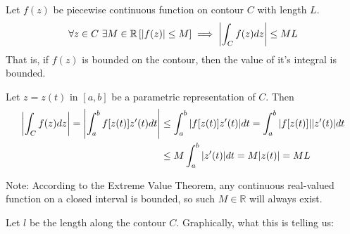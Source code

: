 \documentclass[12pt, english]{book}
\makeatletter
\renewenvironment{proof}[1][\proofname]{\par
	\pushQED{\qed}%
	\normalfont \topsep6\p@\@plus6\p@\relax
	\list{}{%
		\settowidth{\leftmargin}{\itshape\proofname:\hskip\labelsep}%
		\setlength{\labelwidth}{0pt}%
		\setlength{\itemindent}{-\leftmargin}%
	}%
	\item[\hskip\labelsep\itshape#1\@addpunct{:}]\ignorespaces
	}{ \popQED\endlist\@endpefalse}
\makeatother
\begin{document}
	\begin{theorem}[ML Inequality]
		\label{ML Inequality Theorem - Complex}
		Let \(f(z)\) be piecewise continuous function on contour \(C\) with length \(L\).
		\begin{align*}
			\forall z \in C \ \exists M \in \mathbb{R} 
			\left[\abs{f(z)} \leq M \right] \implies \abs{\int_{C} f(z) dz} \leq ML 
		\end{align*}
		That is, if \(f(z)\) is bounded on the contour, then the value of it's integral is bounded. 
	\end{theorem}
	\begin{proof}
		Let \(z = z(t)\) in \([a, b]\) be a parametric representation of \(C\). Then
		\begin{align*}
			\abs{\int_{C} f(z) dz} = \abs{\int_{a}^{b} f[z(t)] z'(t) dt} 
			&\leq \int_{a}^{b} \abs{f[z(t)] z'(t)} dt = \int_{a}^{b}  \abs{f[z(t)]} \abs{z'(t)} dt  \\
			&\leq M \int_{a}^{b} \abs{z'(t)} dt = M \abs{z(t)} = ML
		\end{align*}
	\end{proof}

	Note: According to the Extreme Value Theorem, any continuous real-valued function on a closed interval is bounded, so such \(M \in \mathbb{R}\) will always exist. 
	
	\begin{observation}
		Let \(l\) be the length along the contour \(C\). Graphically, what this is telling us:
		\begin{figure}[H]
			\centering
		\end{figure}
	\end{observation}
\end{document}
